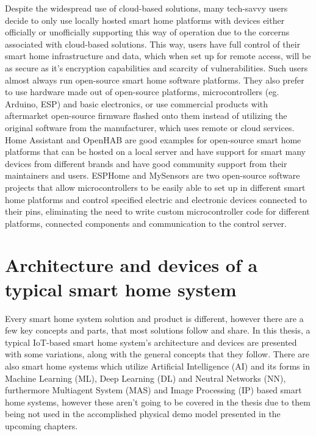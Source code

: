 Despite the widespread use of cloud-based solutions, many tech-savvy users decide to only use locally hosted smart home platforms with devices either officially or unofficially supporting this way of operation due to the corcerns associated with cloud-based solutions. This way, users have full control of their smart home infrastructure and data, which when set up for remote access, will be as secure as it's encryption capabilities and scarcity of vulnerabilities. Such users almost always run open-source smart home software platforms. They also prefer to use hardware made out of open-source platforms, microcontrollers (eg. Arduino, ESP) and basic electronics, or use commercial products with aftermarket open-source firmware flashed onto them instead of utilizing the original software from the manufacturer, which uses remote or cloud services. Home Assistant and OpenHAB are good examples for open-source smart home platforms that can be hosted on a local server and have support for smart many devices from different brands and have good community support from their maintainers and users. \cite{HAHomepage} \cite{openHABHomepage} ESPHome and MySensors are two open-source software projects that allow microcontrollers to be easily able to set up in different smart home platforms and control specified electric and electronic devices connected to their pins, eliminating the need to write custom microcontroller code for different platforms, connected components and communication to the control server. \cite{ESPHomeHomepage} \cite{MySensorsHomepage}

\section{Architecture and devices of a typical smart home system}

Every smart home system solution and product is different, however there are a few key concepts and parts, that most solutions follow and share. In this thesis, a typical IoT-based smart home system's architecture and devices are presented with some variations, along with the general concepts that they follow. There are also smart home systems which utilize Artificial Intelligence (AI) and its forms in Machine Learning (ML), Deep Learning (DL) and Neutral Networks (NN), furthermore Multiagent System (MAS) and Image Processing (IP) based smart home systems, however these aren't going to be covered in the thesis due to them being not used in the accomplished physical demo model presented in the upcoming chapters. \cite{ChakSHS}

